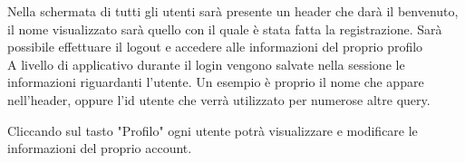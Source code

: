 \begin{center}
\end{center}
Nella schermata di tutti gli utenti sarà presente un header che darà il benvenuto, il nome visualizzato sarà quello con il quale è stata fatta la registrazione. Sarà possibile effettuare il logout e accedere alle informazioni del proprio profilo \\
A livello di applicativo durante il login vengono salvate nella sessione le informazioni riguardanti l'utente. Un esempio è proprio il nome che appare nell'header, oppure l'id utente che verrà utilizzato per numerose altre query.
\begin{center}
\end{center}
Cliccando sul tasto "Profilo" ogni utente potrà visualizzare e modificare le informazioni del proprio account.
